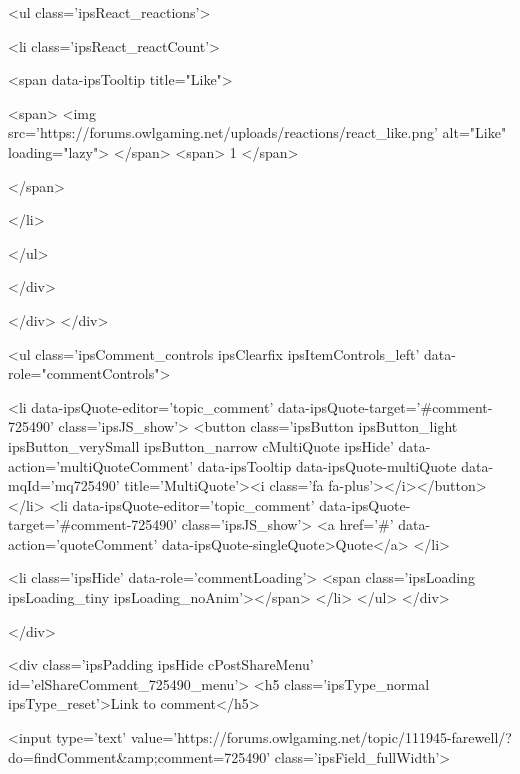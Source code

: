 						

	
	<ul class='ipsReact_reactions'>
		
		
			
				
				<li class='ipsReact_reactCount'>
					
						<span data-ipsTooltip title="Like">
					
							<span>
								<img src='https://forums.owlgaming.net/uploads/reactions/react_like.png' alt="Like" loading="lazy">
							</span>
							<span>
								1
							</span>
					
						</span>
					
				</li>
			
		
	</ul>

					
				</div>
			
			
			
		</div>
	</div>

					
				
				<ul class='ipsComment_controls ipsClearfix ipsItemControls_left' data-role="commentControls">
					
						
							<li data-ipsQuote-editor='topic_comment' data-ipsQuote-target='#comment-725490' class='ipsJS_show'>
								<button class='ipsButton ipsButton_light ipsButton_verySmall ipsButton_narrow cMultiQuote ipsHide' data-action='multiQuoteComment' data-ipsTooltip data-ipsQuote-multiQuote data-mqId='mq725490' title='MultiQuote'><i class='fa fa-plus'></i></button>
							</li>
							<li data-ipsQuote-editor='topic_comment' data-ipsQuote-target='#comment-725490' class='ipsJS_show'>
								<a href='#' data-action='quoteComment' data-ipsQuote-singleQuote>Quote</a>
							</li>
						
						
						
					
					<li class='ipsHide' data-role='commentLoading'>
						<span class='ipsLoading ipsLoading_tiny ipsLoading_noAnim'></span>
					</li>
				</ul>
			</div>
		

		
	</div>

	

	



<div class='ipsPadding ipsHide cPostShareMenu' id='elShareComment_725490_menu'>
	<h5 class='ipsType_normal ipsType_reset'>Link to comment</h5>
	
		
	
	
	<input type='text' value='https://forums.owlgaming.net/topic/111945-farewell/?do=findComment&amp;comment=725490' class='ipsField_fullWidth'>

